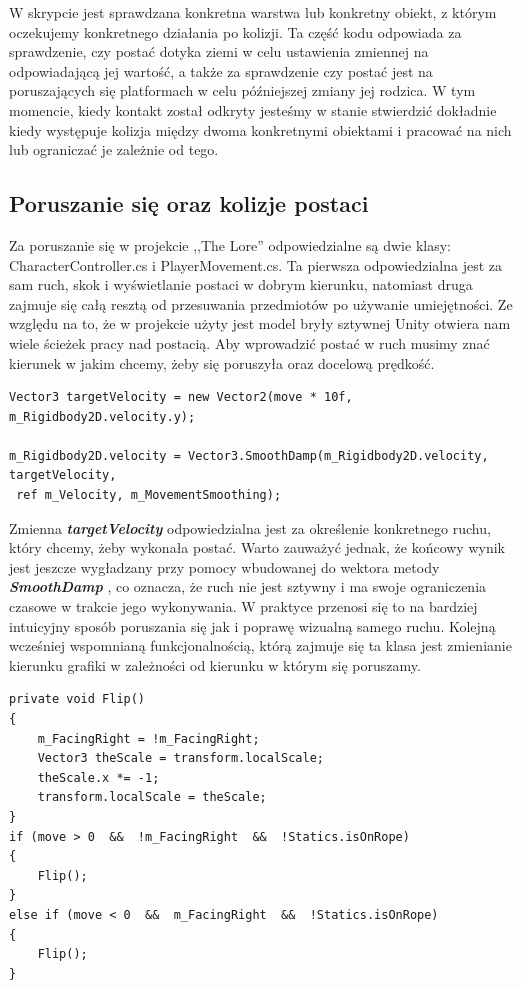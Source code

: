 \documentclass[oneside,polski,logo]{amuthesis}
\begin{document}
W skrypcie jest sprawdzana konkretna warstwa lub konkretny obiekt, z którym oczekujemy konkretnego działania po kolizji.
Ta część kodu odpowiada za sprawdzenie, czy postać dotyka ziemi w celu ustawienia zmiennej na odpowiadającą jej wartość, a także za sprawdzenie czy postać jest na poruszających się platformach w celu późniejszej zmiany jej rodzica.
W tym momencie, kiedy kontakt został odkryty jesteśmy w stanie stwierdzić dokładnie kiedy występuje kolizja między dwoma konkretnymi obiektami i pracować na nich lub ograniczać je zależnie od tego.
\subsection{Poruszanie się oraz kolizje postaci}
Za poruszanie się w projekcie ,,The Lore'' odpowiedzialne są dwie klasy: CharacterController.cs i PlayerMovement.cs. Ta pierwsza odpowiedzialna jest za sam ruch, skok i wyświetlanie postaci w dobrym kierunku, natomiast druga zajmuje się całą resztą od przesuwania przedmiotów po używanie umiejętności. Ze względu na to, że w projekcie użyty jest model bryły sztywnej Unity otwiera nam wiele ścieżek pracy nad postacią. Aby wprowadzić postać w ruch musimy znać kierunek w jakim chcemy, żeby się poruszyła oraz docelową prędkość.

\begin{lstlisting}[breaklines=true,
language={[Sharp]C},
rulecolor=\color{blue!80!black},
caption={Fragment klasy \texttt{CharacterController.cs}}
]
Vector3 targetVelocity = new Vector2(move * 10f, m_Rigidbody2D.velocity.y);

m_Rigidbody2D.velocity = Vector3.SmoothDamp(m_Rigidbody2D.velocity, targetVelocity,
 ref m_Velocity, m_MovementSmoothing);
\end{lstlisting}

Zmienna \textbf{\textit{targetVelocity}} odpowiedzialna jest za określenie konkretnego ruchu, który chcemy, żeby wykonała postać. Warto zauważyć jednak, że końcowy wynik jest jeszcze wygładzany przy pomocy wbudowanej do wektora metody \textbf{\textit{SmoothDamp}} \cite{physics2}, co oznacza, że ruch nie jest sztywny i ma swoje ograniczenia czasowe w trakcie jego wykonywania. W praktyce przenosi się to na bardziej intuicyjny sposób poruszania się jak i poprawę wizualną samego ruchu.
Kolejną wcześniej wspomnianą funkcjonalnością, którą zajmuje się ta klasa jest zmienianie kierunku grafiki w zależności od kierunku w którym się poruszamy.

\begin{lstlisting}[breaklines=true,
language={[Sharp]C},
rulecolor=\color{blue!80!black},
caption={Fragment klasy \texttt{CharacterController.cs}}
]
private void Flip()
{
	m_FacingRight = !m_FacingRight;
	Vector3 theScale = transform.localScale;
	theScale.x *= -1;
	transform.localScale = theScale;
}
if (move > 0  &&  !m_FacingRight  &&  !Statics.isOnRope)
{
	Flip();
}
else if (move < 0  &&  m_FacingRight  &&  !Statics.isOnRope)
{ 
	Flip();
}
\end{lstlisting}
\end{document}
